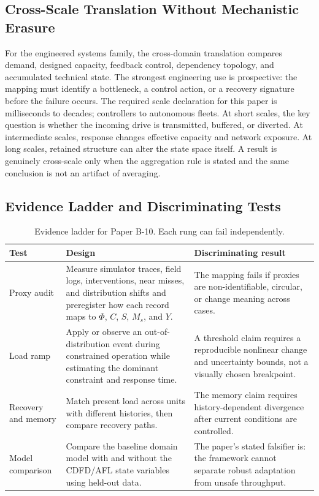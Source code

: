 \documentclass[11pt,a4paper]{article}
\begin{document}
\subsection{Cross-Scale Translation Without Mechanistic Erasure}

For the engineered systems family, the cross-domain translation compares demand, designed capacity, feedback control, dependency topology, and accumulated technical state. The strongest engineering use is prospective: the mapping must identify a bottleneck, a control action, or a recovery signature before the failure occurs. \cite{BarabasiAlbert1999,WattsStrogatz1998,Shannon1948,BakTangWiesenfeld1987}
The required scale declaration for this paper is milliseconds to decades; controllers to autonomous fleets. At short
scales, the key question is whether the incoming drive is transmitted,
buffered, or diverted. At intermediate scales, response changes effective
capacity and network exposure. At long scales, retained structure can alter the
state space itself. A result is genuinely cross-scale only when the aggregation
rule is stated and the same conclusion is not an artifact of averaging.

\subsection{Evidence Ladder and Discriminating Tests}

\begin{table}[htbp]
\centering
\small
\caption{Evidence ladder for Paper B-10. Each rung can fail independently.}
\begin{tabularx}{\textwidth}{|p{}|X|X|}
\hline
\textbf{Test} & \textbf{Design} & \textbf{Discriminating result} \\
\hline
Proxy audit & Measure simulator traces, field logs, interventions, near misses, and distribution shifts and preregister how each record maps to $\Phi$, $C$, $S$, $M_s$, and $Y$. & The mapping fails if proxies are non-identifiable, circular, or change meaning across cases. \\
\hline
Load ramp & Apply or observe an out-of-distribution event during constrained operation while estimating the dominant constraint and response time. & A threshold claim requires a reproducible nonlinear change and uncertainty bounds, not a visually chosen breakpoint. \\
\hline
Recovery and memory & Match present load across units with different histories, then compare recovery paths. & The memory claim requires history-dependent divergence after current conditions are controlled. \\
\hline
Model comparison & Compare the baseline domain model with and without the CDFD/AFL state variables using held-out data. & The paper's stated falsifier is: the framework cannot separate robust adaptation from unsafe throughput. \\
\hline
\end{tabularx}
\end{table}
\end{document}
